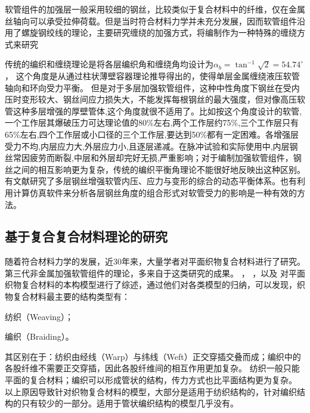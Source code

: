 软管组件的加强层一般采用较细的钢丝，比较类似于复合材料中的纤维，仅在金属丝轴向可以承受拉伸荷载。但是当时符合材料力学并未充分发展，因而软管组件沿用了螺旋钢绞线的理论，主要研究缠绕的加强方式\cite{Entwistle1977,Knapp1979}，将编制作为一种特殊的缠绕方式来研究\cite{Breig1988}

传统的编织和缠绕理论是将各层编织角和缠绕角均设计为$  {\alpha _b} = {\tan ^{ - 1}}\sqrt 2  = {54.74^ \circ }$，
这个角度是从通过柱状薄壁容器理论推导得出的，使得单层金属缠绕液压软管轴向和环向受力平衡。
但是对于多层加强软管组件，这种中性角度下钢丝在受内压时变形较大、钢丝间应力损失大\cite{Evans2002}，不能发挥每根钢丝的最大强度，但对像高压软管这种多层增强的厚壁管体,这个角度就很不适用了。比如按这个角度设计的软管,一个工作层其爆破压力可达理论值的80\%左右,两个工作层约75\%,三个工作层只有65\%左右,四个工作层或小口径的三个工作层,要达到50\%都有一定困难\cite{tangxi1994}。各增强层受力不均,内层应力大,外层应力小,且逐层递减。在脉冲试验和实际使用中,内层钢丝常因疲劳而断裂,中层和外层却完好无损,严重影响；对于编制加强软管组件，钢丝之间的相互影响更为复杂，传统的编织平衡角理论不能很好地反映出这种区别。有文献研究了多层钢丝增强软管内压、应力与变形的综合的动态平衡体系\cite{tangxi1994,Evans2002}。也有利用计算仿真软件来分析各层钢丝角度的组合形式对软管受力的影响是一种有效的方法\cite{zhubowei2010}。 


\subsection{基于复合复合材料理论的研究}


随着符合材料力学的发展，近30年来，大量学者对平面织物复合材料进行了研究。第三代非金属加强软管组件的理论，多来自于这类研究的成果。
\citeauthor{Tan1997}\cite{Tan1997}，
\citeauthor{cox_handbook_1997}\cite{cox_handbook_1997}，以及
\citeauthor{ko_three-dimensional_1989}\cite{ko_three-dimensional_1989}
对平面织物复合材料的本构模型进行了综述，通过他们对各类模型的归纳，可以发现，织物复合材料最主要的结构类型有\cite{Goyal2005}：
\begin{inparaenum}[1).]
	\item 纺织（Weaving）；
	\item 编织（Braiding）。
\end{inparaenum}
其区别在于：纺织由经线（Warp）与纬线（Weft）正交穿插交叠而成；编织中的各股纤维不需要正交穿插，因此各股纤维间的相互作用更加复杂。
纺织一般只能平面的复合材料；编织可以形成管状的结构，传力方式也比平面结构更为复杂。
以上原因导致针对织物复合材料的模型，大部分是适用于纺织结构的，针对编织结构的只有较少的一部分。适用于管状编织结构的模型几乎没有\cite{Tan1997}。


